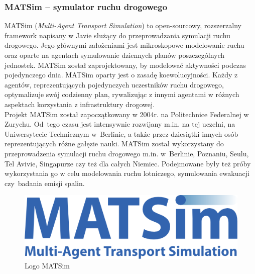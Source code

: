 \subsubsection{MATSim -- symulator ruchu drogowego}
MATSim (\textit{Multi-Agent Transport Simulation}) to open-sourcowy, rozszerzalny framework napisany w Javie służący do przeprowadzania symulacji ruchu drogowego. Jego głównymi założeniami jest mikroskopowe modelowanie ruchu oraz oparte na agentach symulowanie dziennych planów poszczególnych jednostek\cite{matsim}. MATSim został zaprojektowany, by modelować aktywności podczas pojedynczego dnia. MATSim oparty jest o zasadę koewolucyjności. Każdy z agentów, reprezentujących pojedynczych uczestników ruchu drogowego, optymalizuje swój codzienny plan, rywalizując z innymi agentami w różnych aspektach korzystania z infrastruktury drogowej.\\
Projekt MATSim został zapoczątkowany w 2004r. na Politechnice Federalnej w Zurychu. Od~tego czasu jest intensywnie rozwijany m.in. na tej uczelni, na Uniwersytecie Technicznym w~Berlinie, a także przez dziesiątki innych osób reprezentujących różne gałęzie nauki. MATSim został wykorzystany do przeprowadzenia symulacji ruchu drogowego m.in. w~Berlinie, Poznaniu, Seulu, Tel Avivie, Singapurze czy też dla całych Niemiec. Podejmowane były też próby wykorzystania go w celu modelowania ruchu lotniczego, symulowania ewakuacji czy~badania emisji spalin.
    \begin{figure}[h]
        \caption{Logo MATSim}
        \includegraphics[width=\textwidth]{images/matsim_logo.png}
    \end{figure}
